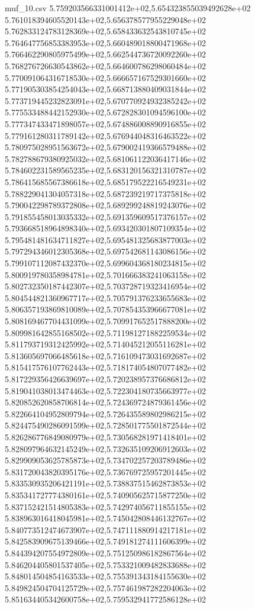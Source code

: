 \begin{filecontents*}{muf_10.csv}
5.759203566331001412e+02,5.654323855039492628e+02
5.761018394605520143e+02,5.656378577955229048e+02
5.762833124783128369e+02,5.658433632543810745e+02
5.764647756853383953e+02,5.660489018800471968e+02
5.766462290805975499e+02,5.662544736720092260e+02
5.768276726630543862e+02,5.664600786298060484e+02
5.770091064316718530e+02,5.666657167529301660e+02
5.771905303854254043e+02,5.668713880409031844e+02
5.773719445232823091e+02,5.670770924932385242e+02
5.775533488442152930e+02,5.672828301094596100e+02
5.777347433471898057e+02,5.674886008890916855e+02
5.779161280311789142e+02,5.676944048316463522e+02
5.780975028951563672e+02,5.679002419366579488e+02
5.782788679380925032e+02,5.681061122036417146e+02
5.784602231589565235e+02,5.683120156321310787e+02
5.786415685567386618e+02,5.685179522216549231e+02
5.788229041304057318e+02,5.687239219717375818e+02
5.790042298789372808e+02,5.689299248819243076e+02
5.791855458013035332e+02,5.691359609517376157e+02
5.793668518964898340e+02,5.693420301807109354e+02
5.795481481634711827e+02,5.695481325683877003e+02
5.797294346012305368e+02,5.697542681143086156e+02
5.799107112087432370e+02,5.699604368180234815e+02
5.800919780358984781e+02,5.701666383241063158e+02
5.802732350187442307e+02,5.703728719323416954e+02
5.804544821360967717e+02,5.705791376233655683e+02
5.806357193869810089e+02,5.707854353966677081e+02
5.808169467704431099e+02,5.709917652517888200e+02
5.809981642855168502e+02,5.711981271882259534e+02
5.811793719312425992e+02,5.714045212055116281e+02
5.813605697066485618e+02,5.716109473031692687e+02
5.815417576107762443e+02,5.718174054807077482e+02
5.817229356426639697e+02,5.720238957376686812e+02
5.819041038013474463e+02,5.722304180735663977e+02
5.820852620858706814e+02,5.724369724879361456e+02
5.822664104952809794e+02,5.726435589802986215e+02
5.824475490286091599e+02,5.728501775501872544e+02
5.826286776849080979e+02,5.730568281971418401e+02
5.828097964632145249e+02,5.732635109206912603e+02
5.829909053625785873e+02,5.734702257203789486e+02
5.831720043820395176e+02,5.736769725957201445e+02
5.833530935206421191e+02,5.738837515462873853e+02
5.835341727774380161e+02,5.740905625715877250e+02
5.837152421514805383e+02,5.742974056711855155e+02
5.838963016418045981e+02,5.745042808446132767e+02
5.840773512474673907e+02,5.747111880914217181e+02
5.842583909675139466e+02,5.749181274111606399e+02
5.844394207554972809e+02,5.751250986182867564e+02
5.846204405801537405e+02,5.753321009482833688e+02
5.848014504854163533e+02,5.755391343184155630e+02
5.849824504704125729e+02,5.757461987282204063e+02
5.851634405342600758e+02,5.759532941772586128e+02

\end{filecontents*}
